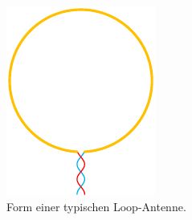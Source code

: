 \begin{figure}
	\centering
	\includegraphics{papers/antennen/images/loopAntenne.pdf}
	\caption{Form einer typischen Loop-Antenne.}
	\label{antennen:loopAntenne}
\end{figure}